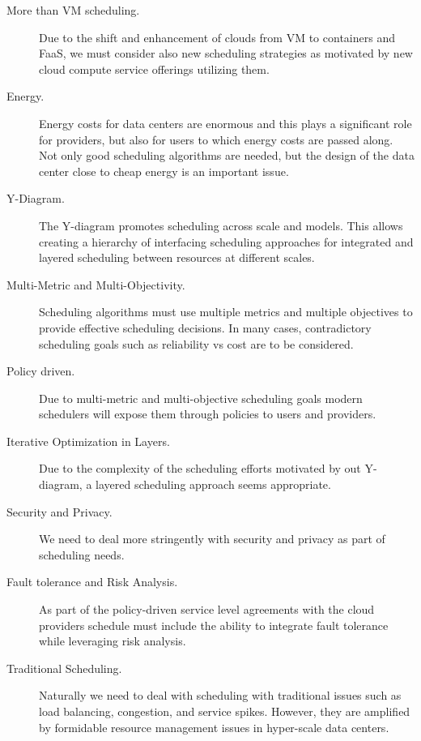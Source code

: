 \documentclass[final,5p,times,twocolumn]{elsarticle}
\begin{document}
\begin{description}

\item[More than VM scheduling.] Due to the shift and enhancement of clouds from VM to containers and FaaS, we must consider also new scheduling strategies as motivated by new cloud compute service offerings utilizing them.

\item[Energy.] Energy costs for data centers are enormous and this plays a significant role for providers, but also for users to which energy costs are passed along. Not only good scheduling algorithms are needed, but the design of the data center close to cheap energy is an important issue.

\item[Y-Diagram.] The Y-diagram promotes scheduling across scale and models. This allows creating a hierarchy of interfacing scheduling approaches for integrated and layered scheduling between resources at different scales.

\item[Multi-Metric and Multi-Objectivity.] Scheduling algorithms must use multiple metrics and multiple objectives to provide effective scheduling decisions. In many cases, contradictory scheduling goals such as reliability vs cost are to be considered.

\item[Policy driven.] Due to multi-metric and multi-objective scheduling goals modern schedulers will expose them through policies to users and providers.

\item[Iterative Optimization in Layers.] Due to the complexity of the scheduling efforts motivated by out Y-diagram, a layered scheduling approach seems appropriate.

\item[Security and Privacy.] We need to deal more stringently with security and privacy as part of scheduling needs.

\item[Fault tolerance and Risk Analysis.] As part of the policy-driven service level agreements with the cloud providers schedule must include the ability to integrate fault tolerance while leveraging risk analysis.

\item[Traditional Scheduling.] Naturally we need to deal with scheduling with traditional issues such as load balancing, congestion, and service spikes. However, they are amplified by formidable resource management issues in hyper-scale data centers.



\end{description}
\end{document}
